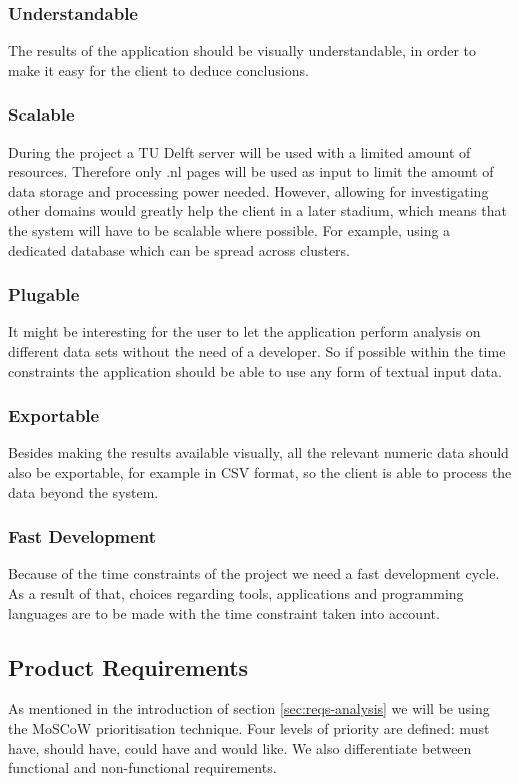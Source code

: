 \subsubsection{Understandable} The results of the application should be visually understandable, in order to make it easy for the client to deduce conclusions. 
\subsubsection{Scalable} During the project a TU Delft server will be used with a limited amount of resources. Therefore only .nl pages will be used as input to limit the amount of data storage and processing power needed. However, allowing for investigating other domains would greatly help the client in a later stadium, which means that the system will have to be scalable where possible. For example, using a dedicated database which can be spread across clusters.
\subsubsection{Plugable} It might be interesting for the user to let the application perform analysis on different data sets without the need of a developer. So if possible within the time constraints the application should be able to use any form of textual input data.
\subsubsection{Exportable} Besides making the results available visually, all the relevant numeric data should also be exportable, for example in CSV format, so the client is able to process the data beyond the system.
\subsubsection{Fast Development} Because of the time constraints of the project we need a fast development cycle. As a result of that, choices regarding tools, applications and programming languages are to be made with the time constraint taken into account.


\subsection{Product Requirements}\label{sec:reqs}
As mentioned in the introduction of section \ref{sec:reqs-analysis} we will be using the MoSCoW prioritisation technique. Four levels of priority are defined: must have, should have, could have and would like. We also differentiate between functional and non-functional requirements. 

